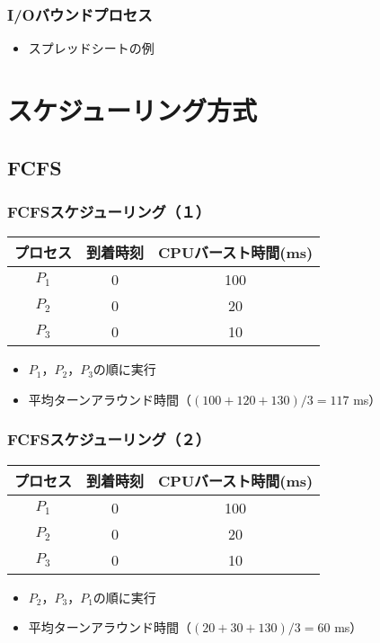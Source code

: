 \documentclass[unicode]{beamer}                   %
\begin{document}
\begin{frame}
  \frametitle{I/Oバウンドプロセス}
  \begin{itemize}
    \item スプレッドシートの例
  \end{itemize}
\end{frame}

\section{スケジューリング方式}
\subsection{FCFS}
\begin{frame}
  \frametitle{FCFSスケジューリング（１）}
  \small\begin{tabular}{c c c}
    プロセス & 到着時刻 & CPUバースト時間(ms) \\
    \hline
    $P_1$    & 0 & 100 \\
    $P_2$    & 0 & 20 \\
    $P_3$    & 0 & 10 \\
  \end{tabular}
  \begin{itemize}
    \item $P_1$，$P_2$，$P_3$の順に実行
    \item 平均ターンアラウンド時間（$(100+120+130) / 3 = 117$ ms）
  \end{itemize}
\end{frame}

\begin{frame}
  \frametitle{FCFSスケジューリング（２）}
  \small\begin{tabular}{c c c}
    プロセス & 到着時刻 & CPUバースト時間(ms) \\
    \hline
    $P_1$    & 0 & 100 \\
    $P_2$    & 0 & 20 \\
    $P_3$    & 0 & 10 \\
  \end{tabular}
  \begin{itemize}
    \item $P_2$，$P_3$，$P_1$の順に実行
    \item 平均ターンアラウンド時間（$(20+30+130) / 3 = 60$ ms）
  \end{itemize}
\end{frame}
\end{document}

